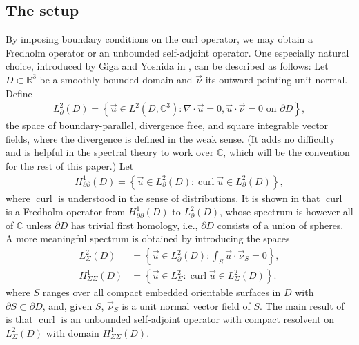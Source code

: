 \documentclass[11pt,reqno]{amsart}
\DeclareMathOperator{\curl}{curl}
\begin{document}
\subsection{The setup}
 By imposing boundary conditions on the curl operator, we may obtain a Fredholm operator or an unbounded self-adjoint operator. One especially natural choice, introduced by Giga and Yoshida in \cite{GigaYoshida1990}, can be described as follows: Let $D\subset \mathbb R^3$ be a smoothly bounded domain and $\vec \nu$ its outward pointing unit normal. Define 
\begin{align*}
    L^2_\partial(D) = \left\{\vec u \in L^2(D,\mathbb C^3): \nabla \cdot \vec u = 0, \vec u \cdot \vec \nu = 0 \text{ on } \partial D\right\},
\end{align*}
the space of boundary-parallel, divergence free, and square integrable vector fields, where the divergence is defined in the weak sense. (It adds no difficulty and is helpful in the spectral theory to work over $\mathbb C$, which will be the convention for the rest of this paper.) Let
\begin{align*}
    H^1_{\partial\partial}(D) = \left\{\vec u \in L^2_\partial(D): \curl \vec u \in L^2_\partial(D)\right\},
\end{align*}
where $\curl$ is understood in the sense of distributions. It is shown in \cite{GigaYoshida1990} that $\curl$ is a Fredholm operator from $H^1_{\partial\partial}(D)$ to $L^2_\partial(D)$, whose spectrum is however all of $\mathbb C$ unless $\partial D$ has trivial first homology, i.e., $\partial D$ consists of a union of spheres. A more meaningful spectrum is obtained by introducing the spaces
\begin{align*}
    L^2_\Sigma(D) &= \left\{\vec u \in L^2_\partial(D): \textstyle\int_S \vec u \cdot \vec \nu_S = 0 \right\}, \\
    H^1_{\Sigma\Sigma}(D) &= \left\{\vec u \in L^2_\Sigma: \curl \vec u \in L^2_\Sigma(D)\right\}.
\end{align*}
where $S$ ranges over all compact embedded orientable surfaces in $D$ with $\partial S \subset \partial D$, and, given $S$, $\vec\nu_S$ is a unit normal vector field of $S$.
The main result of \cite{GigaYoshida1990} is that $\curl$ is an unbounded self-adjoint operator with compact resolvent on $L^2_\Sigma(D)$ with domain $H^1_{\Sigma\Sigma}(D)$.
\end{document}
